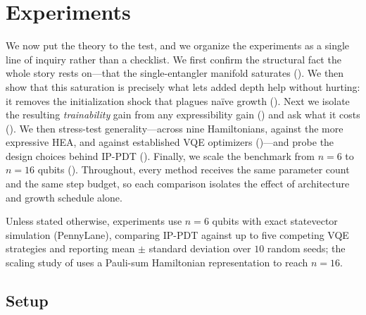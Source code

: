 \documentclass[11pt]{article}
\theoremstyle{plain}
\theoremstyle{plain}
\begin{document}
\section{Experiments}\label{sec:experiments}
We now put the theory to the test, and we organize the experiments as a
single line of inquiry rather than a checklist.  We first confirm the
structural fact the whole story rests on---that the single-entangler
manifold saturates ().  We then show that this
saturation is precisely what lets added depth help without hurting: it
removes the initialization shock that plagues na\"ive growth
(). %
Next we isolate the resulting
\emph{trainability} gain from any expressibility gain
() and ask what it costs
().  We then stress-test generality---across
nine Hamiltonians, against the more expressive HEA, and against
established VQE optimizers
()---and
probe the design choices behind IP-PDT
().
Finally, we scale the benchmark from $n=6$ to $n=16$ qubits
().  Throughout, every method receives the same
parameter count and the same step budget, so each comparison isolates
the effect of architecture and growth schedule alone.

Unless stated otherwise, experiments use $n=6$ qubits with exact
statevector simulation (PennyLane), comparing IP-PDT against up to five
competing VQE strategies and reporting mean $\pm$ standard deviation over
$10$ random seeds; the scaling study of  uses a
Pauli-sum Hamiltonian representation to reach $n=16$.
\subsection{Setup}\label{sec:exp_setup}
\end{document}
